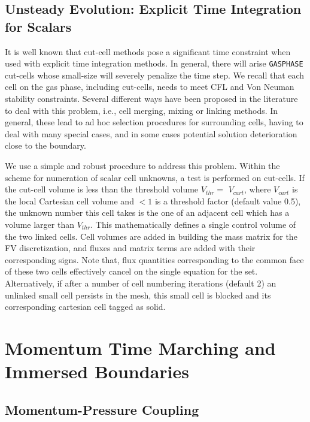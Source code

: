 \subsection{Unsteady Evolution: Explicit Time Integration for Scalars} \label{sec:exscl}

It is well known that cut-cell methods pose a significant time constraint when used with explicit time integration methods.
In general, there will arise \texttt{GASPHASE} cut-cells whose small-size will severely penalize
the time step. We recall that each cell on the gas phase, including cut-cells, needs to meet CFL and Von Neuman stability constraints. Several different ways have been proposed in the literature to deal with this problem, i.e., cell merging, mixing or linking methods. In general, these lead to ad hoc selection procedures for surrounding cells, having to deal with many special cases, and in some cases potential solution deterioration close to the boundary.

We use a simple and robust procedure to address this problem. Within the scheme for numeration of scalar cell unknowns, a test is performed on cut-cells. If the cut-cell volume is less than the threshold volume $V_{thr}= $ $V_{cart}$, where $V_{cart}$ is the local Cartesian cell volume and $<1$ is a threshold factor (default value 0.5), the unknown number this cell takes is the one of an adjacent cell which has a volume larger than $V_{thr}$. This mathematically defines a single control volume of the two linked cells. Cell volumes are added in building the mass matrix for the FV discretization, and fluxes and matrix terms are added with their corresponding signs. Note that, flux quantities corresponding to the common face of these two cells effectively cancel on the single equation for the set.
Alternatively, if after a number of cell numbering iterations (default 2) an unlinked small cell persists in the mesh, this small cell is blocked and its corresponding cartesian cell tagged as solid. %

\section{Momentum Time Marching and Immersed Boundaries}

\subsection{Momentum-Pressure Coupling}

